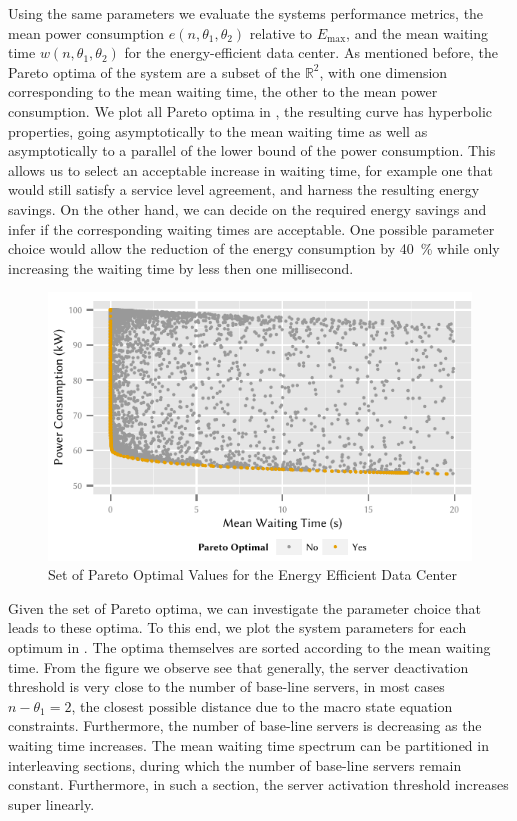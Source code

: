 Using the same parameters we evaluate the systems performance metrics, the mean power consumption \(e(n, \theta_1, \theta_2)\) relative to \(E_\text{max}\), and the mean waiting time \(w(n, \theta_1, \theta_2)\) for the energy-efficient data center.
As mentioned before, the Pareto optima of the system are a subset of the \(\mathbb{R}^2\), with one dimension corresponding to the mean waiting time, the other to the mean power consumption.
We plot all Pareto optima in , the resulting curve has hyperbolic properties, going asymptotically to the mean waiting time as well as asymptotically to a parallel of the lower bound of the power consumption.
This allows us to select an acceptable increase in waiting time, for example one that would still satisfy a service level agreement, and harness the resulting energy savings.
On the other hand, we can decide on the required energy savings and infer if the corresponding waiting times are acceptable.
One possible parameter choice would allow the reduction of the energy consumption by \SI{40}{\percent} while only increasing the waiting time by less then one millisecond.

\begin{figure}
  \centering
  \includegraphics{cloud/data_centers/performance_evaluation/figures/energy_vs_waiting_pareto}
  \caption{Set of Pareto Optimal Values for the Energy Efficient Data Center}
  \label{fig:cloud:data_centers:performance_evaluation:energy_vs_waiting_pareto}
\end{figure}

Given the set of Pareto optima, we can investigate the parameter choice that leads to these optima.
To this end, we plot the system parameters for each optimum in .
The optima themselves are sorted according to the mean waiting time.
From the figure we observe see that generally, the server deactivation threshold is very close to the number of base-line servers, in most cases \(n - \theta_1 = 2\), the closest possible distance due to the macro state equation constraints.
Furthermore, the number of base-line servers is decreasing as the waiting time increases. 
The mean waiting time spectrum can be partitioned in interleaving sections, during which the number of base-line servers remain constant.
Furthermore, in such a section, the server activation threshold increases super linearly.

